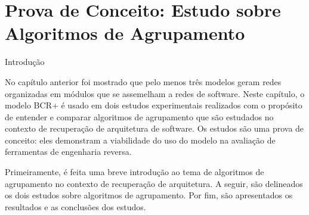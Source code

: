 
\chapter{Prova de Conceito: Estudo sobre Algoritmos de Agrupamento} \label{cap:estudo}


\begin{section}{Introdução}

No capítulo anterior foi mostrado que pelo menos três modelos geram redes organizadas em módulos que se assemelham a redes de software. Neste capítulo, o modelo BCR+ é usado em dois estudos experimentais realizados com o propósito de entender e comparar algoritmos de agrupamento que são estudados no contexto de recuperação de arquitetura de software. Os estudos são uma prova de conceito: eles demonstram a viabilidade do uso do modelo na avaliação de ferramentas de engenharia reversa.


Primeiramente, é feita uma breve introdução ao tema de algoritmos de agrupamento no contexto de recuperação de arquitetura. A seguir, são delineados os dois estudos sobre algoritmos de agrupamento. Por fim, são apresentados os resultados e as conclusões dos estudos.

\end{section}

